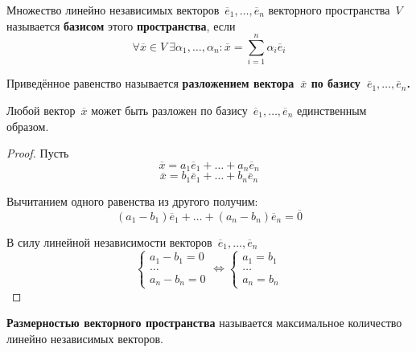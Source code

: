  Множество линейно независимых векторов~$\overline e_1, \ldots, \overline e_n$ векторного пространства~$V$ называется \textbf{базисом} этого \textbf{пространства}, если
\begin{equation*}
\forall \overline x \in V \
\exists \alpha_1, \ldots, \alpha_n \colon
\overline x = \sum_{i=1}^n \alpha_i \overline e_i
\end{equation*}

Приведённое равенство называется \textbf{разложением вектора~$\overline x$ по базису~$\overline e_1, \ldots, \overline e_n$.}

\begin{theorem}[о~базисе]
Любой вектор~$\overline x$ может быть разложен по базису~$\overline e_1, \ldots, \overline e_n$ единственным образом.
\end{theorem}
\begin{proof}
Пусть
\begin{equation*}
\overline x = a_1 \overline e_1 + \ldots + a_n \overline e_n
\end{equation*}
\begin{equation*}
\overline x = b_1 \overline e_1 + \ldots + b_n \overline e_n
\end{equation*}

Вычитанием одного равенства из другого получим:
\begin{equation*}
(a_1 - b_1) \overline e_1 + \ldots + (a_n - b_n) \overline e_n = \overline 0
\end{equation*}

В силу линейной независимости векторов~$\overline e_1, \ldots, \overline e_n$
\begin{equation*}
\begin{cases}
a_1 - b_1 = 0 \\
\ldots \\
a_n - b_n = 0
\end{cases}
\Leftrightarrow
\begin{cases}
a_1 = b_1 \\
\ldots \\
a_n = b_n
\end{cases}
\end{equation*}
\end{proof}

\textbf{Размерностью векторного пространства} называется максимальное количество линейно независимых векторов.

